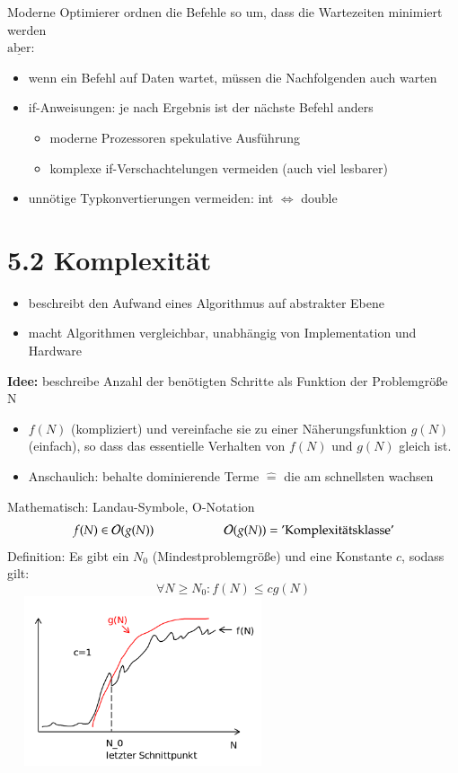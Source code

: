 \documentclass[11pt, fleqn]{scrreprt}
\begin{document}
    \vspace*{-0.8cm}
    Moderne Optimierer ordnen die Befehle so um, dass die Wartezeiten minimiert werden\\
    $\underline{\text{aber}}$:
    \begin{itemize}
        \item wenn ein Befehl auf Daten wartet, müssen die Nachfolgenden auch warten
        \item if-Anweisungen: je nach Ergebnis ist der nächste Befehl anders
        \begin{itemize}[label={$\Rightarrow$}]
            \item moderne Prozessoren \glqq spekulative Ausführung\grqq
            \item komplexe if-Verschachtelungen vermeiden (auch viel lesbarer)
        \end{itemize}
        \item unnötige Typkonvertierungen vermeiden: int $\Leftrightarrow$ double
    \end{itemize}

\section*{5.2 Komplexität}
\begin{itemize}
    \item beschreibt den Aufwand eines Algorithmus auf abstrakter Ebene
    \item macht Algorithmen vergleichbar, unabhängig von Implementation und Hardware
\end{itemize}
\textbf{Idee:} beschreibe Anzahl der benötigten Schritte als Funktion der Problemgröße N
\begin{itemize}[label={}]
    \item $f(N)$ (kompliziert) und vereinfache sie zu einer Näherungsfunktion $g(N)$ (einfach), so dass das essentielle Verhalten von $f(N)$ und $g(N)$ gleich ist.
    \item Anschaulich: behalte dominierende Terme $\widehat{=}$ die am schnellsten wachsen
\end{itemize}
Mathematisch: Landau-Symbole, \glqq O-Notation\grqq \\
\[f(N) \in \mathcal O(g(N)) \hspace*{2cm} \mathcal O(g(N)) = \text{'Komplexitätsklasse'}\]
Definition: Es gibt ein $N_0$ (Mindestproblemgröße) und eine Konstante $c$, sodass gilt:
\[\forall N \geq N_0: f(N) \leq c g(N)\]
\includegraphics[width=8cm,height=5cm,keepaspectratio]{./Pictures/Komplexitaet.png}
\end{document}
